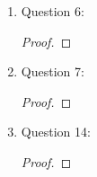 \documentclass{article}
\begin{document}
\begin{enumerate}
\begin{enumerate}
      \item Question 6:
        \begin{proof}
        \end{proof}

      \item Question 7:
        \begin{proof}
        \end{proof}

      \item Question 14:
        \begin{proof}
        \end{proof}
    \end{enumerate}
\end{enumerate}
\end{document}
